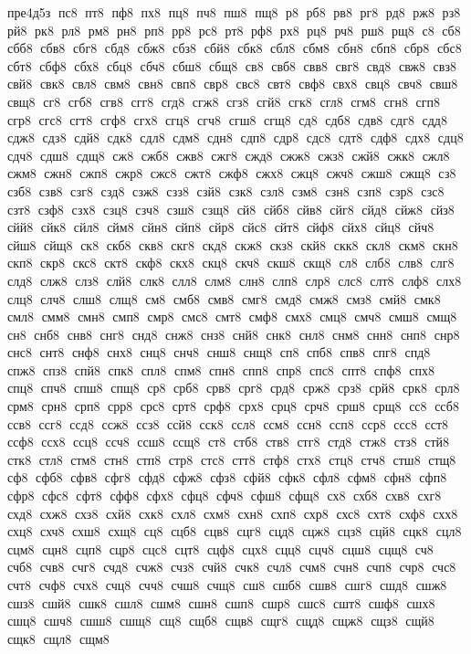  пре4д5з  пс8  пт8  пф8  пх8  пц8  пч8  пш8  пщ8  р8  рб8  рв8  рг8  рд8  рж8  рз8  рй8  рк8  рл8  рм8  рн8  рп8  рр8  рс8  рт8  рф8  рх8  рц8  рч8  рш8  рщ8  с8  сб8  сбб8  сбв8  сбг8  сбд8  сбж8  сбз8  сбй8  сбк8  сбл8  сбм8  сбн8  сбп8  сбр8  сбс8  сбт8  сбф8  сбх8  сбц8  сбч8  сбш8  сбщ8  св8  свб8  свв8  свг8  свд8  свж8  свз8  свй8  свк8  свл8  свм8  свн8  свп8  свр8  свс8  свт8  свф8  свх8  свц8  свч8  свш8  свщ8  сг8  сгб8  сгв8  сгг8  сгд8  сгж8  сгз8  сгй8  сгк8  сгл8  сгм8  сгн8  сгп8  сгр8  сгс8  сгт8  сгф8  сгх8  сгц8  сгч8  сгш8  сгщ8  сд8  сдб8  сдв8  сдг8  сдд8  сдж8  сдз8  сдй8  сдк8  сдл8  сдм8  сдн8  сдп8  сдр8  сдс8  сдт8  сдф8  сдх8  сдц8  сдч8  сдш8  сдщ8  сж8  сжб8  сжв8  сжг8  сжд8  сжж8  сжз8  сжй8  сжк8  сжл8  сжм8  сжн8  сжп8  сжр8  сжс8  сжт8  сжф8  сжх8  сжц8  сжч8  сжш8  сжщ8  сз8  сзб8  сзв8  сзг8  сзд8  сзж8  сзз8  сзй8  сзк8  сзл8  сзм8  сзн8  сзп8  сзр8  сзс8  сзт8  сзф8  сзх8  сзц8  сзч8  сзш8  сзщ8  сй8  сйб8  сйв8  сйг8  сйд8  сйж8  сйз8  сйй8  сйк8  сйл8  сйм8  сйн8  сйп8  сйр8  сйс8  сйт8  сйф8  сйх8  сйц8  сйч8  сйш8  сйщ8  ск8  скб8  скв8  скг8  скд8  скж8  скз8  скй8  скк8  скл8  скм8  скн8  скп8  скр8  скс8  скт8  скф8  скх8  скц8  скч8  скш8  скщ8  сл8  слб8  слв8  слг8  слд8  слж8  слз8  слй8  слк8  слл8  слм8  слн8  слп8  слр8  слс8  слт8  слф8  слх8  слц8  слч8  слш8  слщ8  см8  смб8  смв8  смг8  смд8  смж8  смз8  смй8  смк8  смл8  смм8  смн8  смп8  смр8  смс8  смт8  смф8  смх8  смц8  смч8  смш8  смщ8  сн8  снб8  снв8  снг8  снд8  снж8  снз8  снй8  снк8  снл8  снм8  снн8  снп8  снр8  снс8  снт8  снф8  снх8  снц8  снч8  снш8  снщ8  сп8  спб8  спв8  спг8  спд8  спж8  спз8  спй8  спк8  спл8  спм8  спн8  спп8  спр8  спс8  спт8  спф8  спх8  спц8  спч8  спш8  спщ8  ср8  срб8  срв8  срг8  срд8  срж8  срз8  срй8  срк8  срл8  срм8  срн8  срп8  срр8  срс8  срт8  срф8  срх8  срц8  срч8  срш8  срщ8  сс8  ссб8  ссв8  ссг8  ссд8  ссж8  ссз8  ссй8  сск8  ссл8  ссм8  ссн8  ссп8  сср8  ссс8  сст8  ссф8  ссх8  ссц8  ссч8  ссш8  ссщ8  ст8  стб8  ств8  стг8  стд8  стж8  стз8  стй8  стк8  стл8  стм8  стн8  стп8  стр8  стс8  стт8  стф8  стх8  стц8  стч8  стш8  стщ8  сф8  сфб8  сфв8  сфг8  сфд8  сфж8  сфз8  сфй8  сфк8  сфл8  сфм8  сфн8  сфп8  сфр8  сфс8  сфт8  сфф8  сфх8  сфц8  сфч8  сфш8  сфщ8  сх8  схб8  схв8  схг8  схд8  схж8  схз8  схй8  схк8  схл8  схм8  схн8  схп8  схр8  схс8  схт8  схф8  схх8  схц8  схч8  схш8  схщ8  сц8  сцб8  сцв8  сцг8  сцд8  сцж8  сцз8  сцй8  сцк8  сцл8  сцм8  сцн8  сцп8  сцр8  сцс8  сцт8  сцф8  сцх8  сцц8  сцч8  сцш8  сцщ8  сч8  счб8  счв8  счг8  счд8  счж8  счз8  счй8  счк8  счл8  счм8  счн8  счп8  счр8  счс8  счт8  счф8  счх8  счц8  счч8  счш8  счщ8  сш8  сшб8  сшв8  сшг8  сшд8  сшж8  сшз8  сшй8  сшк8  сшл8  сшм8  сшн8  сшп8  сшр8  сшс8  сшт8  сшф8  сшх8  сшц8  сшч8  сшш8  сшщ8  сщ8  сщб8  сщв8  сщг8  сщд8  сщж8  сщз8  сщй8  сщк8  сщл8  сщм8  